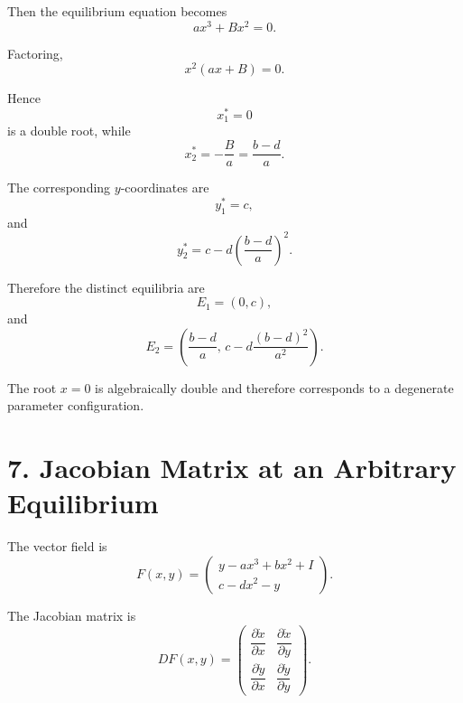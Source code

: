 \documentclass[11pt,a4paper]{article}
\begin{document}
Then the equilibrium equation becomes
\begin{equation}
ax^3+Bx^2=0.
\end{equation}

Factoring,
\begin{equation}
x^2(ax+B)=0.
\end{equation}

Hence
\begin{equation}
\boxed{
x_1^*=0
}
\tag{25}
\end{equation}
is a double root, while
\begin{equation}
\boxed{
x_2^*=-\frac{B}{a}
=
\frac{b-d}{a}.
}
\tag{26}
\end{equation}

The corresponding $y$-coordinates are
\begin{equation}
y_1^*=c,
\end{equation}
and
\begin{equation}
y_2^*
=
c-d
\left(
\frac{b-d}{a}
\right)^2.
\end{equation}

Therefore the distinct equilibria are
\begin{equation}
\boxed{
E_1=(0,c),
}
\tag{27}
\end{equation}
and
\begin{equation}
\boxed{
E_2=
\left(
\frac{b-d}{a},
\,
c-d\frac{(b-d)^2}{a^2}
\right).
}
\tag{28}
\end{equation}

The root $x=0$ is algebraically double and therefore corresponds to a
degenerate parameter configuration.

\section{7. Jacobian Matrix at an Arbitrary Equilibrium}

The vector field is
\begin{equation}
F(x,y)
=
\begin{pmatrix}
y-a x^3+b x^2+I\\
c-dx^2-y
\end{pmatrix}.
\end{equation}

The Jacobian matrix is
\begin{equation}
DF(x,y)
=
\begin{pmatrix}
\dfrac{\partial\dot x}{\partial x}
&
\dfrac{\partial\dot x}{\partial y}
\\[3mm]
\dfrac{\partial\dot y}{\partial x}
&
\dfrac{\partial\dot y}{\partial y}
\end{pmatrix}.
\end{equation}
\end{document}
